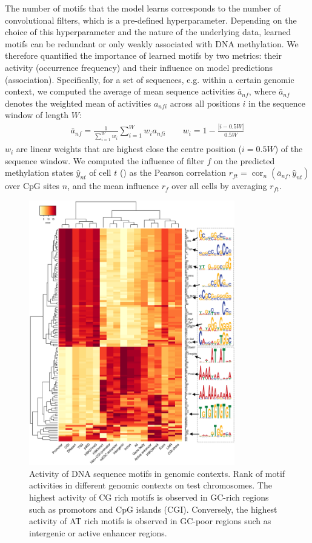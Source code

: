 The number of motifs that the model learns corresponds to the number of convolutional filters, which is a pre-defined hyperparameter. Depending on the choice of this hyperparameter and the nature of the underlying data, learned motifs can be redundant or only weakly associated with DNA methylation. We therefore quantified the importance of learned motifs by two metrics: their activity (occurrence frequency) and their influence on model predictions (association). Specifically, for a set of sequences, e.g. within a certain genomic context, we computed the average of mean sequence activities $\bar{a}_{nf}$, where $\bar{a}_{nf}$ denotes the weighted mean of activities $a_{nfi}$ across all positions $i$ in the sequence window of length $W$:
\begin{align}
  \bar{a}_{nf}=\frac{1}{\sum_{i=1}^W w_i} \sum_{i=1}^W w_i a_{nfi} \qquad w_i=1-\frac{|i-0.5W|}{0.5W}
\end{align}
$w_i$ are linear weights that are highest close the centre position ($i=0.5W$) of the sequence window. We computed the influence of filter $f$ on the predicted methylation states $\hat{y}_{nt}$ of cell $t$ () as the Pearson correlation $r_{ft}=\operatorname{cor}_n(\bar{a}_{nf},\hat{y}_{nt})$ over CpG sites $n$, and the mean influence $r_f$ over all cells by averaging $r_{ft}$.

\begin{figure}[htbp!]
\centering
\includegraphics[width=0.8\textwidth]{motifs_act}
\caption[Activity of DNA sequence motifs in genomic contexts.]{Activity of DNA sequence motifs in genomic contexts. Rank of motif activities in different genomic contexts on test chromosomes. The highest activity of CG rich motifs is observed in GC-rich regions such as promotors and CpG islands (CGI). Conversely, the highest activity of AT rich motifs is observed in GC-poor regions such as intergenic or active enhancer regions.}
\label{fig:dcpg_motifs_act}
\end{figure}

